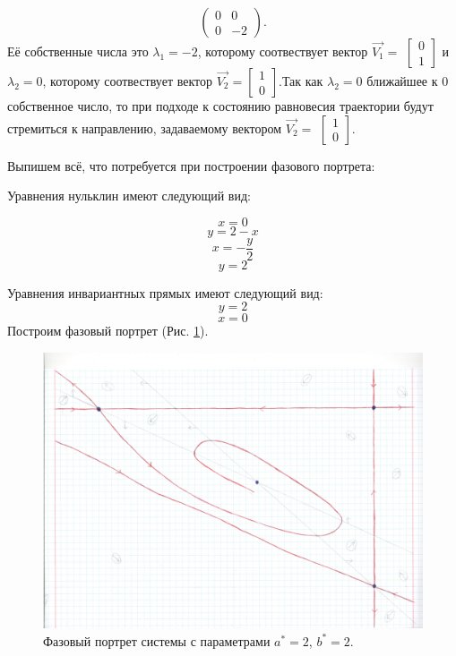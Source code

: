 \begin{itemize}
{		$$\begin{pmatrix}0 & 0\\0 & -2\end{pmatrix}. $$Её собственные числа это $\lambda_1=-2$, которому соотвествует вектор $\Vec{V_1}=$ $\left[\begin{matrix}0\\1\end{matrix}\right]$ и $\lambda_2=0$, которому соотвествует вектор $\Vec{V_2}=$$\left[\begin{matrix}1\\0\end{matrix}\right]$.Так как $\lambda_2=0$ ближайшее к $0$ собственное число, то при подходе к состоянию равновесия траектории будут стремиться к направлению, задаваемому вектором $\Vec{V_2}=$ $\left[\begin{matrix}1\\0\end{matrix}\right]$.}
\end{itemize} 

Выпишем всё, что потребуется при построении фазового портрета:

Уравнения нульклин имеют следующий вид: 

$$x=0$$
$$y=2 - x$$
$$x=- \frac{y}{2}$$
$$y=2$$


Уравнения инвариантных прямых имеют следующий вид: 
$$y = 2$$
$$x = 0$$
Построим фазовый портрет (Рис. \ref{fig:phportr10}).

\begin{figure}[h]
	
	\includegraphics[width=\textwidth]{phptr/(20, 7).jpeg}
	\centering
	\caption{\label{fig:phportr10} Фазовый портрет системы с параметрами $a^\ast = 2$, $b^\ast = 2$.}
	
\end{figure}

